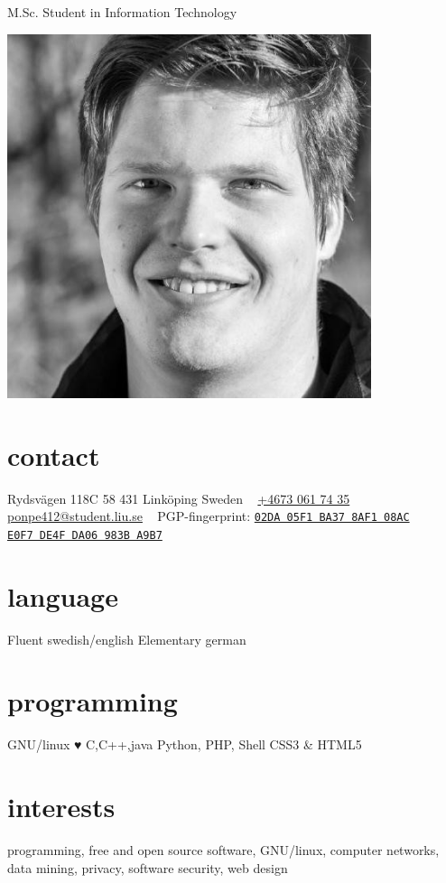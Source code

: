 \documentclass[]{friggeri-cv}
\begin{document}
       {M.Sc. Student in Information Technology}


\begin{aside}
	\includegraphics[width=0.8\textwidth]{me.jpg}
  \section{contact}
    Rydsvägen 118C
    58 431 Linköping
    Sweden
    ~
    \href{tel:+4673067435}{+4673 061 74 35}
    \href{mailto:ponpe412@student.liu.se}{ponpe412@stu\nolinebreak dent.liu.se}
	~
	PGP-fingerprint:
	\href{https://pgp.mit.edu/pks/lookup?op=get&search=0xDE4FDA06983BA9B7}{\texttt{02DA
	05F1 BA37 8AF1 08AC\\ E0F7 DE4F DA06 983B A9B7}}
  \section{language}
    Fluent swedish/english
    Elementary german
  \section{programming}
  GNU/linux ♥
    C,C++,java
    Python, PHP, Shell
    CSS3 \& HTML5
\end{aside}

\section{interests}
{\centering programming, free and open source software, GNU/linux, computer networks,
data mining, privacy, software security, web design}
\end{document}
